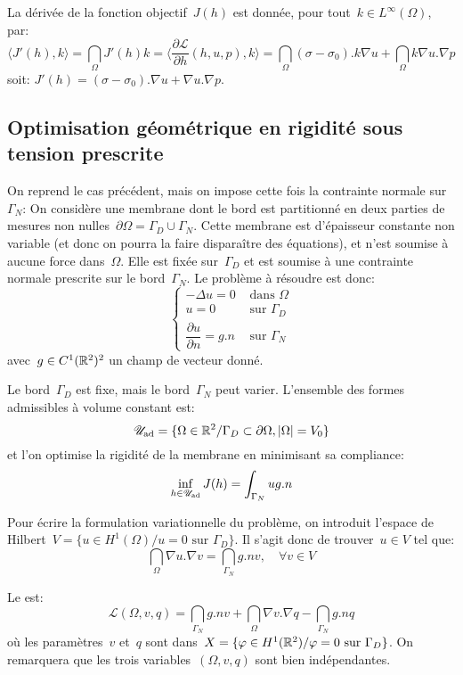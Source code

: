 \medskip
La dérivée de la fonction objectif~$J(h)$ est donnée, pour tout~$k\in L^\infty(\Omega)$, par:
\[ \langle J'(h),k\rangle = \dint_\Omega J'(h)k = \langle\dfrac{\partial\mathscr{L}}{\partial h}(h,u,p),k\rangle = \dint_\Omega (\sigma-\sigma_0).k\nabla u+\dint_\Omega k\nabla u.\nabla p  \]
soit: $J'(h)=(\sigma-\sigma_0).\nabla u + \nabla u.\nabla p$.


\medskip
\subsection{Optimisation géométrique en rigidité sous tension prescrite}

On reprend le cas précédent, mais on impose cette fois la contrainte normale sur~$\Gamma_N$:
On considère une membrane dont le bord est partitionné en deux parties de mesures non nulles~$\partial\Omega=\Gamma_D\cup\Gamma_N$. Cette membrane est d'épaisseur constante non variable (et donc on pourra la faire disparaître des équations), et n'est soumise à aucune force dans~$\Omega$. Elle est fixée sur~$\Gamma_D$ et est soumise à une contrainte normale prescrite sur le bord~$\Gamma_N$. Le problème à résoudre est donc:
\[\left\{\begin{array}{ll} -\Delta u =0 &\text{ dans }\Omega\\ 
u=0 &\text{ sur }\Gamma_D\\ 
\dfrac{\partial u}{\partial n} =g.n &\text{ sur }\Gamma_N 
\end{array} \right. \]
avec~$g\in C^1(\mathbb R^2)^2$ un champ de vecteur donné.

Le bord~$\Gamma_D$ est fixe, mais le bord~$\Gamma_N$ peut varier. L'ensemble des formes admissibles à volume constant est:
\[ \mathscr{U}_{\text{ad}} = \{ \Omega\in\mathbb R^2/ \Gamma_D\subset\partial\Omega, |\Omega|=V_0 \} \]
et l'on optimise la rigidité de la membrane en minimisant sa compliance:
\[\colorblue \inf_{h\in\mathscr{U}_{\text{ad}}} J(h) = \dint_{\Gamma_N} ug.n \]

\medskip
Pour écrire la formulation variationnelle du problème, on introduit l'espace de Hilbert~$V=\{u\in H^1(\Omega)/ u=0 \text{ sur }\Gamma_D\}$. Il s'agit donc de trouver~$u\in V$ tel que:
\[ \dint_\Omega \nabla u.\nabla v=\dint_{\Gamma_N} g.nv, \quad \forall v\in V \]

Le  est:
\[ \mathscr{L}(\Omega,v,q) = \dint_{\Gamma_N} g.nv + \dint_\Omega \nabla v.\nabla q - \dint_{\Gamma_N} g.nq \]
où les paramètres~$v$ et~$q$ sont dans~$X=\{\varphi\in H^1(\mathbb R^2)/ \varphi=0 \text{ sur }\Gamma_D \}$.
On remarquera que les trois variables~$(\Omega,v,q)$ sont bien indépendantes.


